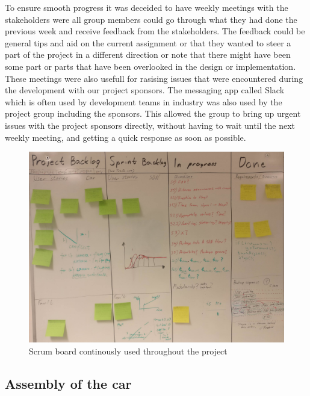 \documentclass[11pt, titlepage]{article} %
\begin{document}
To ensure smooth progress it was deceided to have weekly meetings with the stakeholders were all group members could go through what they had done the previous week and receive feedback from the stakeholders. The feedback could be general tips and aid on the current assignment or that they wanted to steer a part of the project in a different direction or note that there might have been some part or parts that have been overlooked in the design or implementation. These meetings were also usefull for rasising issues that were encountered during the development with our project sponsors. The messaging app called Slack which is often used by development teams in industry was also used by the project group including the sponsors. This allowed the group to bring up urgent issues with the project sponsors directly, without having to wait until the next weekly meeting, and getting a quick response as soon as possible.


\begin{figure}[]
	\centering
   	\includegraphics[scale=0.5]{scrum-board.jpg}
   	\caption{Scrum board continously used throughout the project}
    \label{fig:scrum-board}
\end{figure}



\subsection{Assembly of the car}
\end{document}
